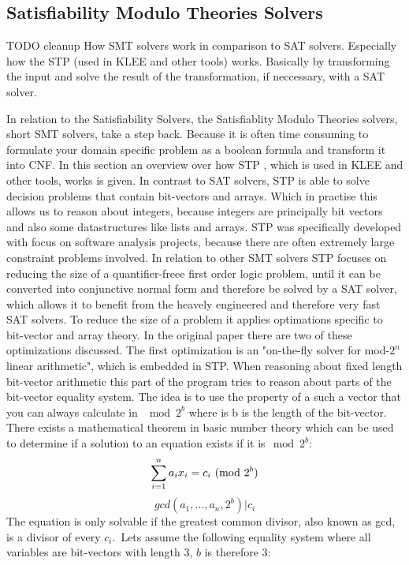 \subsection{Satisfiability Modulo Theories Solvers}
TODO cleanup
How SMT solvers work in comparison to SAT solvers.
Especially how the STP \cite{Ganesh:2007:DPB:1770351.1770421} (used in KLEE and other tools) works.
Basically by transforming the input and solve the result of the transformation, if neccessary, with a SAT solver.

In relation to the Satisfiability Solvers, the Satisfiablity Modulo Theories solvers, short SMT solvers, take a step back. Because it is often time consuming to formulate your domain specific problem as a boolean formula and transform it into CNF. In this section an overview over how STP \cite{Ganesh:2007:DPB:1770351.1770421}, which is used in KLEE and other tools, works is given.
In contrast to SAT solvers, STP is able to solve decision problems that contain bit-vectors and arrays. Which in practise this allows us to reason about integers, because integers are principally bit vectors and also some datastructures like lists and arrays. STP was specifically developed with focus on software analysis projects, because there are often extremely large constraint problems involved. In relation to other SMT solvers STP focuses on reducing the size of a quantifier-freee first order logic problem, until it can be converted into conjunctive normal form and therefore be solved by a SAT solver, which allows it to benefit from the heavely engineered and therefore very fast SAT solvers.
To reduce the size of a problem it applies optimations specific to bit-vector and array theory.
In the original paper\cite{Ganesh:2007:DPB:1770351.1770421} there are two of these optimizations discussed. The first optimization is an "on-the-fly solver for mod-$2^n$ linear arithmetic", which is embedded in STP. 
When reasoning about fixed length bit-vector arithmetic this part of the program tries to reason about parts of the bit-vector equality system.
The idea is to use the property of a such a vector that you can always calculate in $\mod{2^b}$ where is b is the length of the bit-vector.
There exists a mathematical theorem in basic number theory which can be used to determine if a solution to an equation exists if it is$\mod{2^b}$:
$$\sum_{i=1}^{n} a_ix_i = c_i  \ (\mathrm{mod}\ 2^b)$$
$$gcd(a_1,...,a_n,2^b) | c_i$$
The equation is only solvable if the greatest common divisor, also known as gcd, is a divisor of every $c_i$.\
Lets assume the following equality system where all variables are bit-vectors with length 3, $b$ is therefore 3:
